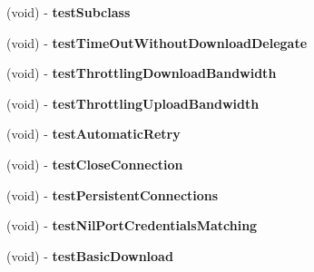 \begin{DoxyCompactItemize}
\item 
\hypertarget{interface_a_s_i_h_t_t_p_request_tests_aeb6e4b4f2fc9f3a74b3cd2a6c42341d5}{
(void) -\/ {\bfseries test\-Subclass}}
\label{interface_a_s_i_h_t_t_p_request_tests_aeb6e4b4f2fc9f3a74b3cd2a6c42341d5}

\item 
\hypertarget{interface_a_s_i_h_t_t_p_request_tests_ae19beb94bca46a1dcb81e4729dc89f2f}{
(void) -\/ {\bfseries test\-Time\-Out\-Without\-Download\-Delegate}}
\label{interface_a_s_i_h_t_t_p_request_tests_ae19beb94bca46a1dcb81e4729dc89f2f}

\item 
\hypertarget{interface_a_s_i_h_t_t_p_request_tests_af14e80be1ca16f71c636a799356bb92d}{
(void) -\/ {\bfseries test\-Throttling\-Download\-Bandwidth}}
\label{interface_a_s_i_h_t_t_p_request_tests_af14e80be1ca16f71c636a799356bb92d}

\item 
\hypertarget{interface_a_s_i_h_t_t_p_request_tests_a65f252fc1eea28887974dd1ff8354609}{
(void) -\/ {\bfseries test\-Throttling\-Upload\-Bandwidth}}
\label{interface_a_s_i_h_t_t_p_request_tests_a65f252fc1eea28887974dd1ff8354609}

\item 
\hypertarget{interface_a_s_i_h_t_t_p_request_tests_aed737183009eb013ed056fb74423c9ab}{
(void) -\/ {\bfseries test\-Automatic\-Retry}}
\label{interface_a_s_i_h_t_t_p_request_tests_aed737183009eb013ed056fb74423c9ab}

\item 
\hypertarget{interface_a_s_i_h_t_t_p_request_tests_a266591fd53dafdd64e6b175e59f1439c}{
(void) -\/ {\bfseries test\-Close\-Connection}}
\label{interface_a_s_i_h_t_t_p_request_tests_a266591fd53dafdd64e6b175e59f1439c}

\item 
\hypertarget{interface_a_s_i_h_t_t_p_request_tests_a23d2a0e836cb5aa242ee26182047fc6b}{
(void) -\/ {\bfseries test\-Persistent\-Connections}}
\label{interface_a_s_i_h_t_t_p_request_tests_a23d2a0e836cb5aa242ee26182047fc6b}

\item 
\hypertarget{interface_a_s_i_h_t_t_p_request_tests_acbb0b3611836a7e04e7fe0b1072e0977}{
(void) -\/ {\bfseries test\-Nil\-Port\-Credentials\-Matching}}
\label{interface_a_s_i_h_t_t_p_request_tests_acbb0b3611836a7e04e7fe0b1072e0977}

\item 
\hypertarget{interface_a_s_i_h_t_t_p_request_tests_aeac324a706cb5b14402328ebfc9d5261}{
(void) -\/ {\bfseries test\-Basic\-Download}}
\label{interface_a_s_i_h_t_t_p_request_tests_aeac324a706cb5b14402328ebfc9d5261}


\end{DoxyCompactItemize}
